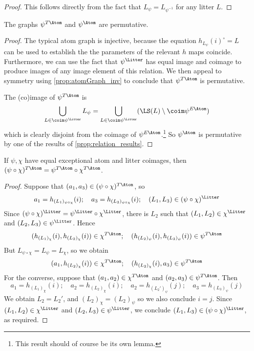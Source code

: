 \begin{proof}
  \leanok
  This follows directly from the fact that \( L_\psi = L_{\psi^{-1}} \) for any litter \( L \).
\end{proof}
\begin{proposition}
  \label{prop:atomGraph_permutative}
  \leanok
  The graphs \( \psi^{T\Atom} \) and \( \psi^\Atom \) are permutative.
\end{proposition}
\begin{proof}
  \leanok
  The typical atom graph is injective, because the equation \( h_{L_\psi}(i)^\circ = L \) can be used to establish the the parameters of the relevant \( h \) maps coincide.
  Furthermore, we can use the fact that \( \psi^\Litter \) has equal image and coimage to produce images of any image element of this relation.
  We then appeal to symmetry using \cref{prop:atomGraph_inv} to conclude that \( \psi^{T\Atom} \) is permutative.

  The (co)image of \( \psi^{T\Atom} \) is
  \[ \bigcup_{L \in \coim \psi^\Litter} L_\psi = \bigcup_{L \in \coim \psi^\Litter} (\LS(L) \setminus \coim \psi^{E\Atom}) \]
  which is clearly disjoint from the coimage of \( \psi^{E\Atom} \).\footnote{This result should of course be its own lemma.}
  So \( \psi^\Atom \) is permutative by one of the results of \cref{prop:relation_results}.
\end{proof}
\begin{proposition}
  \label{prop:comp_atomGraph}
  If \( \psi, \chi \) have equal exceptional atom and litter coimages, then \( (\psi \circ \chi)^{T\Atom} = \psi^{T\Atom} \circ \chi^{T\Atom} \).
\end{proposition}
\begin{proof}
  Suppose that \( (a_1, a_3) \in (\psi \circ \chi)^{T\Atom} \), so
  \[ a_1 = h_{(L_1)_{\psi \circ \chi}}(i);\quad a_3 = h_{(L_3)_{\psi \circ \chi}}(i);\quad (L_1, L_3) \in (\psi \circ \chi)^\Litter \]
  Since \( (\psi \circ \chi)^\Litter = \psi^\Litter \circ \chi^\Litter \), there is \( L_2 \) such that \( (L_1, L_2) \in \chi^\Litter \) and \( (L_2, L_3) \in \psi^\Litter \).
  Hence
  \[ (h_{(L_1)_\chi}(i), h_{(L_2)_\chi}(i)) \in \chi^{T\Atom};\quad (h_{(L_2)_\psi}(i), h_{(L_3)_\psi}(i)) \in \psi^{T\Atom} \]
  But \( L_{\psi \circ \chi} = L_\psi = L_\chi \), so we obtain
  \[ (a_1, h_{(L_2)_\chi}(i)) \in \chi^{T\Atom};\quad (h_{(L_2)_\chi}(i), a_3) \in \psi^{T\Atom} \]
  For the converse, suppose that \( (a_1, a_2) \in \chi^{T\Atom} \) and \( (a_2, a_3) \in \psi^{T\Atom} \).
  Then
  \[ a_1 = h_{(L_1)_\chi}(i);\quad a_2 = h_{(L_2)_\chi}(i);\quad a_2 = h_{(L_2')_\psi}(j);\quad a_3 = h_{(L_3)_\psi}(j) \]
  We obtain \( L_2 = L_2' \), and \( (L_2)_\chi = (L_2)_\psi \) so we also conclude \( i = j \).
  Since \( (L_1, L_2) \in \chi^\Litter \) and \( (L_2, L_3) \in \psi^\Litter \), we conclude \( (L_1, L_3) \in (\psi \circ \chi)^\Litter \), as required.
\end{proof}
